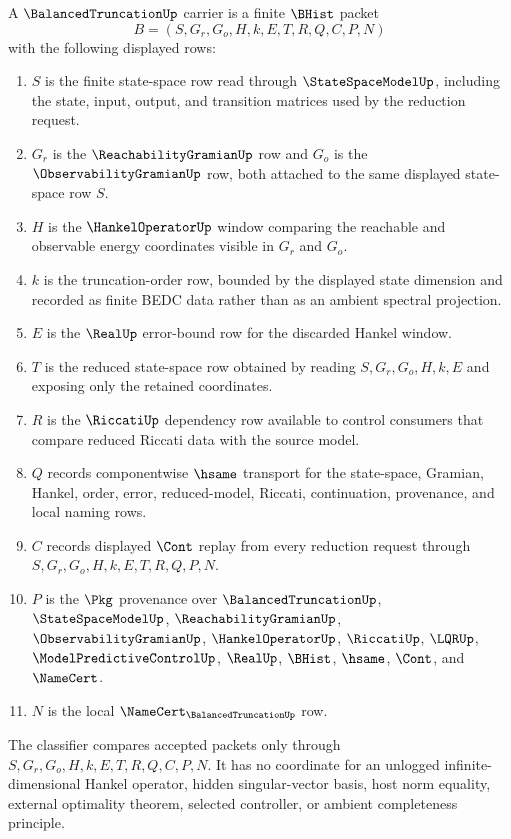 \begin{definition}
\label{def:balanced-truncation-carrier}
A $\BalancedTruncationUp$ carrier is a finite $\BHist$ packet
$$
B=(S,G_r,G_o,H,k,E,T,R,Q,C,P,N)
$$
with the following displayed rows:
\begin{enumerate}
\item $S$ is the finite state-space row read through $\StateSpaceModelUp$, including the state, input, output, and transition matrices used by the reduction request.
\item $G_r$ is the $\ReachabilityGramianUp$ row and $G_o$ is the $\ObservabilityGramianUp$ row, both attached to the same displayed state-space row $S$.
\item $H$ is the $\HankelOperatorUp$ window comparing the reachable and observable energy coordinates visible in $G_r$ and $G_o$.
\item $k$ is the truncation-order row, bounded by the displayed state dimension and recorded as finite BEDC data rather than as an ambient spectral projection.
\item $E$ is the $\RealUp$ error-bound row for the discarded Hankel window.
\item $T$ is the reduced state-space row obtained by reading $S,G_r,G_o,H,k,E$ and exposing only the retained coordinates.
\item $R$ is the $\RiccatiUp$ dependency row available to control consumers that compare reduced Riccati data with the source model.
\item $Q$ records componentwise $\hsame$ transport for the state-space, Gramian, Hankel, order, error, reduced-model, Riccati, continuation, provenance, and local naming rows.
\item $C$ records displayed $\Cont$ replay from every reduction request through $S,G_r,G_o,H,k,E,T,R,Q,P,N$.
\item $P$ is the $\Pkg$ provenance over $\BalancedTruncationUp$, $\StateSpaceModelUp$, $\ReachabilityGramianUp$, $\ObservabilityGramianUp$, $\HankelOperatorUp$, $\RiccatiUp$, $\LQRUp$, $\ModelPredictiveControlUp$, $\RealUp$, $\BHist$, $\hsame$, $\Cont$, and $\NameCert$.
\item $N$ is the local $\NameCert_{\BalancedTruncationUp}$ row.
\end{enumerate}
The classifier compares accepted packets only through $S,G_r,G_o,H,k,E,T,R,Q,C,P,N$. It has no coordinate for an unlogged infinite-dimensional Hankel operator, hidden singular-vector basis, host norm equality, external optimality theorem, selected controller, or ambient completeness principle.
\end{definition}

